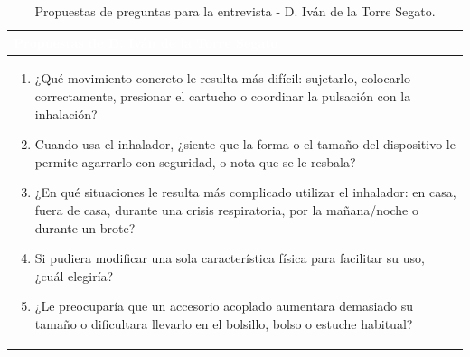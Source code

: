 \documentclass[11pt,a4paper]{article}
\begin{document}
\begin{table}[H]
    \centering
    \small
    \renewcommand{\arraystretch}{1.5}
    \begin{tabularx}{\linewidth}{|X|}
        \hline
        \rowcolor{ArthroNavy}
        \textcolor{white}{\textbf{Propuestas de D. Iván de la Torre Segato}} \\ \hline
        \rowcolor{ArthroTeal!5}
        \vspace{0.1cm}
        \begin{enumerate}[leftmargin=0.8cm, itemsep=0.2cm]
            \item ¿Qué movimiento concreto le resulta más difícil: sujetarlo, colocarlo correctamente, presionar el cartucho o coordinar la pulsación con la inhalación?
            \item Cuando usa el inhalador, ¿siente que la forma o el tamaño del dispositivo le permite agarrarlo con seguridad, o nota que se le resbala?
            \item ¿En qué situaciones le resulta más complicado utilizar el inhalador: en casa, fuera de casa, durante una crisis respiratoria, por la mañana/noche o durante un brote?
            \item Si pudiera modificar una sola característica física para facilitar su uso, ¿cuál elegiría?
            \item ¿Le preocuparía que un accesorio acoplado aumentara demasiado su tamaño o dificultara llevarlo en el bolsillo, bolso o estuche habitual?
        \end{enumerate}
        \vspace{0.1cm} \\ \hline
    \end{tabularx}
    \caption{Propuestas de preguntas para la entrevista - D. Iván de la Torre Segato.}
    \label{tab:preguntas_ivan}
\end{table}

\vspace{0.4cm}
\end{document}

